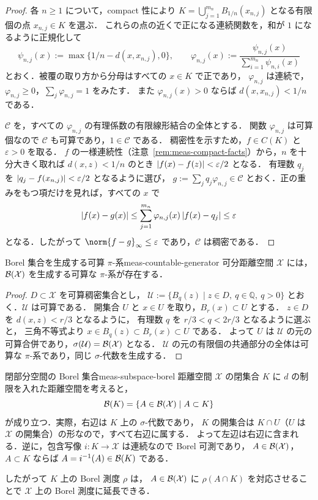 \begin{proof}
  各 $n\geq1$ について，compact 性により
  $K=\bigcup_{j=1}^{m_n}B_{1/n}(x_{n,j})$ となる有限個の点 $x_{n,j}\in K$ を選ぶ．
  これらの点の近くで正になる連続関数を，和が $1$ になるように正規化して
  \[
    \psi_{n,j}(x):=\max\{1/n-d(x,x_{n,j}),0\},\qquad
    \varphi_{n,j}(x):=\frac{\psi_{n,j}(x)}{\sum_{i=1}^{m_n}\psi_{n,i}(x)}
  \]
  とおく．被覆の取り方から分母はすべての $x\in K$ で正であり，
  $\varphi_{n,j}$ は連続で，$\varphi_{n,j}\geq0$，$\sum_j\varphi_{n,j}=1$ をみたす．
  また $\varphi_{n,j}(x)>0$ ならば $d(x,x_{n,j})<1/n$ である．

  $\mathcal{C}$ を，すべての $\varphi_{n,j}$ の有理係数の有限線形結合の全体とする．
  関数 $\varphi_{n,j}$ は可算個なので $\mathcal{C}$ も可算であり，$1\in\mathcal{C}$ である．
  稠密性を示すため，$f\in C(K)$ と $\varepsilon>0$ を取る．
  $f$ の一様連続性（注意~\ref{rem:meas-compact-facts}）から，$n$ を十分大きく取れば
  $d(x,z)<1/n$ のとき $\lvert f(x)-f(z) \rvert<\varepsilon/2$ となる．
  有理数 $q_j$ を $\lvert q_j-f(x_{n,j}) \rvert<\varepsilon/2$ となるように選び，
  $g:=\sum_jq_j\varphi_{n,j}\in\mathcal{C}$ とおく．正の重みをもつ項だけを見れば，すべての $x$ で
  \[
    \lvert f(x)-g(x) \rvert
    \leq\sum_{j=1}^{m_n}\varphi_{n,j}(x)\,\lvert f(x)-q_j \rvert
    \leq\varepsilon
  \]
  となる．したがって $\norm{f-g}_\infty\leq\varepsilon$ であり，$\mathcal{C}$ は稠密である．
\end{proof}

\begin{lemma}{Borel 集合を生成する可算 $\pi$-系}{meas-countable-generator}
  可分距離空間 $\mathcal{X}$ には，$\mathcal{B}(\mathcal{X})$ を生成する可算な $\pi$-系が存在する．
\end{lemma}

\begin{proof}
  $D\subset\mathcal{X}$ を可算稠密集合とし，
  $\mathcal{U}:=\{B_q(z)\mid z\in D,\ q\in\mathbb{Q},\ q>0\}$ とおく．$\mathcal{U}$ は可算である．
  開集合 $U$ と $x\in U$ を取り，$B_r(x)\subset U$ とする．
  $z\in D$ を $d(x,z)<r/3$ となるように，
  有理数 $q$ を $r/3<q<2r/3$ となるように選ぶと，
  三角不等式より $x\in B_q(z)\subset B_r(x)\subset U$ である．
  よって $U$ は $\mathcal{U}$ の元の可算合併であり，$\sigma(\mathcal{U})=\mathcal{B}(\mathcal{X})$ となる．
  $\mathcal{U}$ の元の有限個の共通部分の全体は可算な $\pi$-系であり，同じ $\sigma$-代数を生成する．
\end{proof}

\begin{remark}{閉部分空間の Borel 集合}{meas-subspace-borel}
  距離空間 $\mathcal{X}$ の閉集合 $K$ に $d$ の制限を入れた距離空間を考えると，
  \[
    \mathcal{B}(K)=\{A\in\mathcal{B}(\mathcal{X})\mid A\subset K\}
  \]
  が成り立つ．実際，右辺は $K$ 上の $\sigma$-代数であり，
  $K$ の開集合は $K\cap U$（$U$ は $\mathcal{X}$ の開集合）の形なので，すべて右辺に属する．
  よって左辺は右辺に含まれる．逆に，包含写像 $i\colon K\to\mathcal{X}$ は連続なので Borel 可測であり，
  $A\in\mathcal{B}(\mathcal{X})$，$A\subset K$ ならば $A=i^{-1}(A)\in\mathcal{B}(K)$ である．

  したがって $K$ 上の Borel 測度 $\rho$ は，
  $A\in\mathcal{B}(\mathcal{X})$ に $\rho(A\cap K)$ を対応させることで
  $\mathcal{X}$ 上の Borel 測度に延長できる．
\end{remark}

